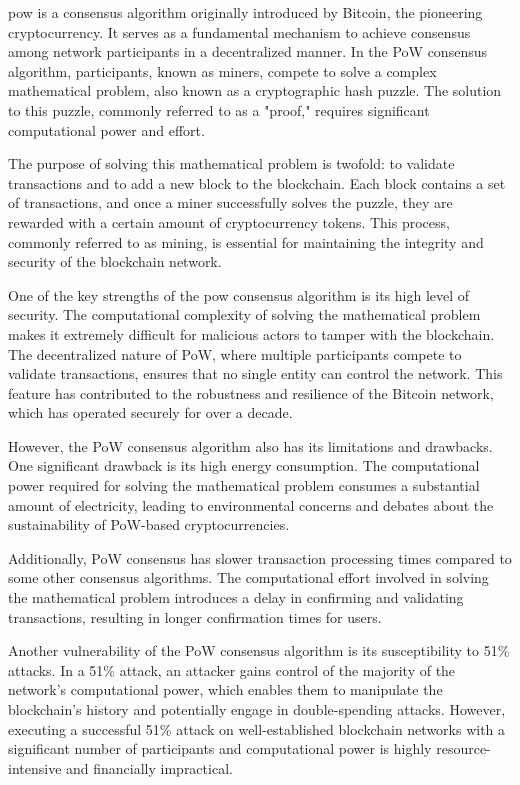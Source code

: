 \gls{pow} is a consensus algorithm originally introduced by Bitcoin, the pioneering cryptocurrency. It serves as a fundamental mechanism to achieve consensus among network participants in a decentralized manner. In the PoW consensus algorithm, participants, known as miners, compete to solve a complex mathematical problem, also known as a cryptographic hash puzzle. The solution to this puzzle, commonly referred to as a "proof," requires significant computational power and effort.

The purpose of solving this mathematical problem is twofold: to validate transactions and to add a new block to the blockchain. Each block contains a set of transactions, and once a miner successfully solves the puzzle, they are rewarded with a certain amount of cryptocurrency tokens. This process, commonly referred to as mining, is essential for maintaining the integrity and security of the blockchain network.

One of the key strengths of the \gls{pow} consensus algorithm is its high level of security. The computational complexity of solving the mathematical problem makes it extremely difficult for malicious actors to tamper with the blockchain. The decentralized nature of PoW, where multiple participants compete to validate transactions, ensures that no single entity can control the network. This feature has contributed to the robustness and resilience of the Bitcoin network, which has operated securely for over a decade.

However, the PoW consensus algorithm also has its limitations and drawbacks. One significant drawback is its high energy consumption. The computational power required for solving the mathematical problem consumes a substantial amount of electricity, leading to environmental concerns and debates about the sustainability of PoW-based cryptocurrencies.

Additionally, PoW consensus has slower transaction processing times compared to some other consensus algorithms. The computational effort involved in solving the mathematical problem introduces a delay in confirming and validating transactions, resulting in longer confirmation times for users.

Another vulnerability of the PoW consensus algorithm is its susceptibility to 51\% attacks. In a 51\% attack, an attacker gains control of the majority of the network's computational power, which enables them to manipulate the blockchain's history and potentially engage in double-spending attacks. However, executing a successful 51\% attack on well-established blockchain networks with a significant number of participants and computational power is highly resource-intensive and financially impractical.

